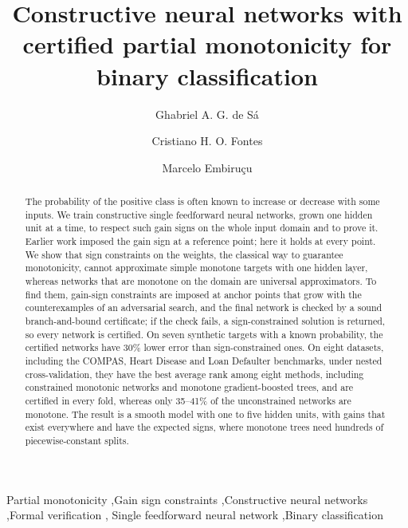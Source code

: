 \documentclass[preprint,12pt,authoryear]{elsarticle}
\begin{document}
\begin{frontmatter}

\title{Constructive neural networks with certified partial monotonicity for binary classification}

\author[ufba]{Ghabriel A. G. de Sá}
\author[ufba]{Cristiano H. O. Fontes}
\author[ufba]{Marcelo Embiruçu}

\begin{abstract}
The probability of the positive class is often known to increase or decrease with some inputs. We train constructive
single feedforward neural networks, grown one hidden unit at a time, to respect such gain signs on the whole input
domain and to prove it. Earlier work imposed the gain sign at a reference point; here it holds at every point. We show
that sign constraints on the weights, the classical way to guarantee monotonicity, cannot approximate simple monotone
targets with one hidden layer, whereas networks that are monotone on the domain are universal approximators. To find
them, gain-sign constraints are imposed at anchor points that grow with the counterexamples of an adversarial search,
and the final network is checked by a sound branch-and-bound certificate; if the check fails, a sign-constrained
solution is returned, so every network is certified. On seven synthetic targets with a known probability, the certified
networks have 30\% lower error than sign-constrained ones. On eight datasets, including the COMPAS, Heart Disease and
Loan Defaulter benchmarks, under nested cross-validation, they have the best average rank among eight methods, including constrained
monotonic networks and monotone gradient-boosted trees, and are certified in every fold, whereas only 35--41\% of the
unconstrained networks are monotone. The result is a smooth model with one to five hidden units, with gains that exist
everywhere and have the expected signs, where monotone trees need hundreds of piecewise-constant splits.
\end{abstract}

\begin{keyword}
Partial monotonicity \sep Gain sign constraints \sep Constructive neural networks \sep Formal verification \sep
Single feedforward neural network \sep Binary classification
\end{keyword}

\end{frontmatter}
\linenumbers
\end{document}

